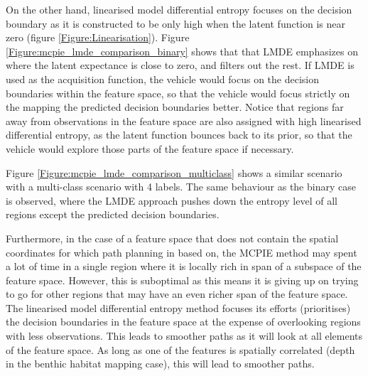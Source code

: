 			On the other hand, linearised model differential entropy focuses on the decision boundary as it is constructed to be only high when the latent function is near zero (figure \ref{Figure:Linearisation}). Figure \ref{Figure:mcpie_lmde_comparison_binary} shows that that LMDE emphasizes on where the latent expectance is close to zero, and filters out the rest. If LMDE is used as the acquisition function, the vehicle would focus on the decision boundaries within the feature space, so that the vehicle would focus strictly on the mapping the predicted decision boundaries better. Notice that regions far away from observations in the feature space are also assigned with high linearised differential entropy, as the latent function bounces back to its prior, so that the vehicle would explore those parts of the feature space if necessary.
			
			Figure \ref{Figure:mcpie_lmde_comparison_multiclass} shows a similar scenario with a multi-class scenario with 4 labels. The same behaviour as the binary case is observed, where the LMDE approach pushes down the entropy level of all regions except the predicted decision boundaries.

			Furthermore, in the case of a feature space that does not contain the spatial coordinates for which path planning in based on, the MCPIE method may spent a lot of time in a single region where it is locally rich in span of a subspace of the feature space. However, this is suboptimal as this means it is giving up on trying to go for other regions that may have an even richer span of the feature space. The linearised model differential entropy method focuses its efforts (prioritises) the decision boundaries in the feature space at the expense of overlooking regions with less observations. This leads to smoother paths as it will look at all elements of the feature space. As long as one of the features is spatially correlated (depth in the benthic habitat mapping case), this will lead to smoother paths.
	
	


